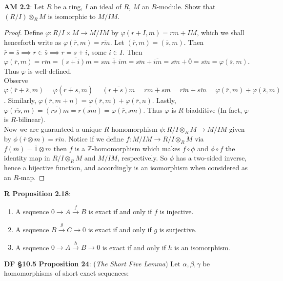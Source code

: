 \documentclass[8pt]{amsart}
\theoremstyle{plain}%
\theoremstyle{definition}
\theoremstyle{remark}
\numberwithin{equation}{section}
\newcommand{\Z}{\mathbb{Z}}
\begin{document}
\textbf{ AM 2.2}: Let $R$ be a ring, $I$ an ideal of $R$, $M$ an $R$-module. Show that $(R/I) \otimes_RM$ is isomorphic to $M/IM$. 
	\begin{proof}
		Define $\varphi : R/I \times M \to M/IM$ by $\varphi(r + I, m) = rm + IM$, which we shall henceforth write as $\varphi(\overline{r}, m) = \overline{rm}$. Let $(\overline{r}, m) = (\overline{s}, m)$. Then $\overline{r} = \overline{s} \implies r \in \overline{s} \implies r=s+i$, some $i \in I$. Then $\varphi(\overline{r},m)=\overline{rm}=\overline{(s+i)m}=\overline{sm+im}=\overline{sm}+\overline{im}=\overline{sm}+\overline{0}=\overline{sm}=\varphi(\overline{s},m)$. Thus $\varphi$ is well-defined.\\ 
		
		Observe $\varphi(\overline{r}+\overline{s},m)=\varphi(\overline{r+s},m)=\overline{(r+s)m}=\overline{rm+sm}=\overline{rm}+\overline{sm}=\varphi(\overline{r},m)+\varphi(\overline{s},m)$. Similarly, $\varphi(\overline{r},m+n)=\varphi(\overline{r},m)+\varphi(\overline{r},n)$. Lastly, $\varphi(\overline{rs},m)=\overline{(rs)m}=\overline{r(sm)}=\varphi(\overline{r},sm)$. Thus $\varphi$ is $R$-biadditive (In fact, $\varphi$ is $R$-bilinear).\\
		
		 Now we are guaranteed a unique $R$-homomorphism $\phi : R/I \otimes_RM \rightarrow M/IM$ given by $\phi(\overline{r} \otimes m)=\overline{rm}$. Notice if we define $f : M/IM \rightarrow R/I \otimes_RM$ via $f(\overline{m})=\overline{1}\otimes m$ then $f$ is a $\Z$-homomorphism which makes $f \circ \phi$ and $\phi \circ f$ the identity map in $R/I \otimes_RM$ and $M/IM$, respectively. So $\phi$ has a two-sided inverse, hence a bijective function, and accordingly is an isomorphism when considered as an $R$-map. 
	\end{proof}
		 

\textbf{R Proposition 2.18}:
	\begin{enumerate}
		\item A sequence $0 \rightarrow A \xrightarrow{f} B$ is exact if and only if $f$ is injective.
		\item A sequence $B \xrightarrow g C \rightarrow 0$ is exact if and only if $g$ is surjective.
		\item A sequence $0 \rightarrow A \xrightarrow{h} B \rightarrow 0$ is exact if and only if $h$ is an isomorphism.
	\end{enumerate}

\textbf{DF \S10.5 Proposition 24}: (\textit{The Short Five Lemma}) Let $\alpha, \beta, \gamma$ be homomorphisms of short exact sequences:\\
\end{document}
